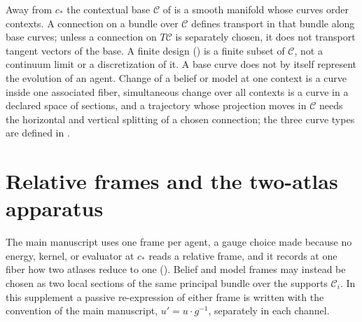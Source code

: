 Away from \(c_*\) the contextual base \(\mathcal C\) of  is a smooth
manifold whose curves order contexts. A connection on a bundle over \(\mathcal C\) defines
transport in that bundle along base curves; unless a connection on \(T\mathcal C\) is separately
chosen, it does not transport tangent vectors of the base. A finite design
() is a finite subset of \(\mathcal C\), not a continuum limit or a
discretization of it. A base curve does not by itself represent the evolution of an agent. Change of
a belief or model at one context is a curve inside one associated fiber, simultaneous change over all
contexts is a curve in a declared space of sections, and a trajectory whose projection moves in
\(\mathcal C\) needs the horizontal and vertical splitting of a chosen connection; the three curve
types are defined in .

\section{Relative frames and the two-atlas apparatus}
\label{sec:geo-relative-frames}

The main manuscript uses one frame per agent, a gauge choice made because no energy, kernel, or
evaluator at \(c_*\) reads a relative frame, and it records at one fiber how two atlases reduce to one
(). Belief and model frames may instead be chosen as two local
sections of the same principal bundle over the supports \(\mathcal C_i\). In this supplement a passive
re-expression of either frame is written with the convention of the main manuscript,
\(u'=u\cdot g^{-1}\), separately in each channel.

